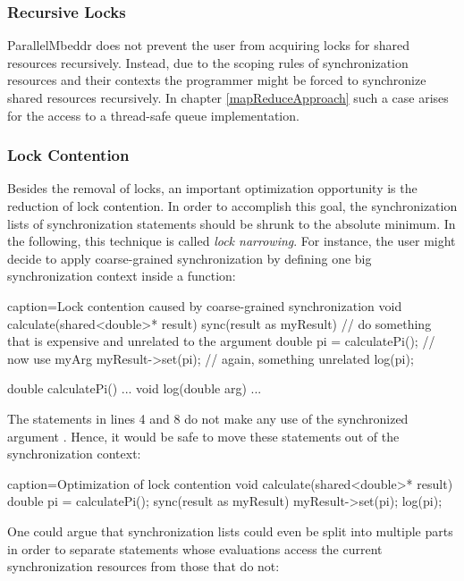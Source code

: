 \subsubsection{Recursive Locks}
ParallelMbeddr does not prevent the user from acquiring locks for shared resources recursively. Instead, due to the scoping rules of synchronization resources and their contexts the programmer might be forced to synchronize shared resources recursively. In chapter \ref{mapReduceApproach} such a case arises for the access to a thread-safe queue implementation.

\subsubsection{Lock Contention}
Besides the removal of locks, an important optimization opportunity is the reduction of lock contention. In order to accomplish this goal, the synchronization lists of synchronization statements should be shrunk to the absolute minimum. In the following, this technique is called \textit{lock narrowing}. For instance, the user might decide to apply coarse-grained synchronization by defining one big synchronization context inside a function:

\begin{ccode}{caption=Lock contention caused by coarse-grained synchronization}
void calculate(shared<double>* result) {
  sync(result as myResult) {
    // do something that is expensive and unrelated to the argument
    double pi = calculatePi();
    // now use myArg
    myResult->set(pi);
    // again, something unrelated
    log(pi);
  }
}

double calculatePi() {...}
void log(double arg) {...}
\end{ccode}

The statements in lines 4 and 8 do not make any use of the synchronized argument . Hence, it would be safe to move these statements out of the synchronization context:

\begin{ccode}{caption=Optimization of lock contention}
void calculate(shared<double>* result) {
  double pi = calculatePi();
  sync(result as myResult) { myResult->set(pi); }
  log(pi);
}
\end{ccode}

One could argue that synchronization lists could even be split into multiple parts in order to separate statements whose evaluations access the current synchronization resources from those that do not:

